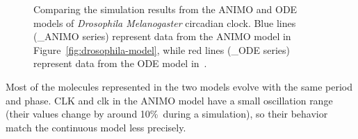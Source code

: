 \documentclass{bmcart}
\begin{document}
\begin{figure}[!htb]
\begin{minipage}{\textwidth}
\begin{tabular}{ccc}
\end{tabular}
\caption{Comparing the simulation results from the ANIMO and ODE models of
\emph{Drosophila Melanogaster} circadian clock. Blue lines ({\sf \_{}ANIMO} series)
represent data from the ANIMO model in Figure~\ref{fig:drosophila-model},
while red lines ({\sf \_{}ODE} series) represent data from the ODE model in~\cite{drosophila-ode-model}.\label{suppl-fig:grafici-drosophila}}
\end{minipage}
\end{figure}

Most of the molecules represented in the two models evolve with the same period and phase.
CLK and clk in the ANIMO model have
a small oscillation range (their values change by around 10\%\ during a simulation),
so their behavior match the continuous model less precisely.
%
%
%
\end{document}
